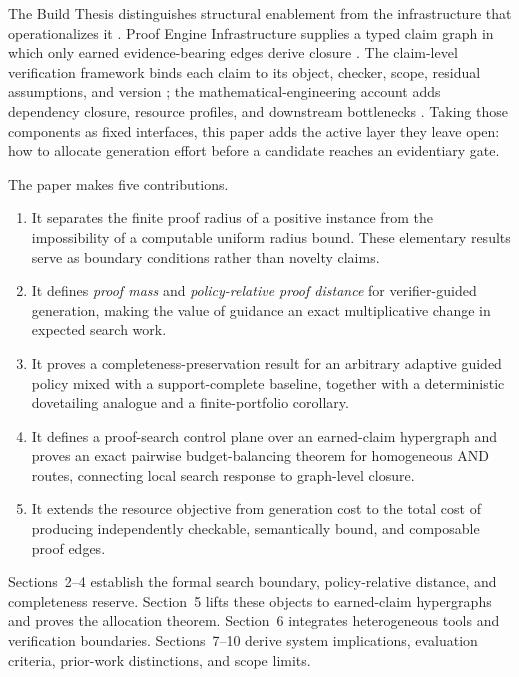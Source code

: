 \documentclass[11pt]{article}
\begin{document}
The Build Thesis distinguishes structural enablement from the infrastructure
that operationalizes it \citep{li2026build}.  Proof Engine Infrastructure
supplies a typed claim graph in which only earned evidence-bearing edges derive
closure \citep{li2026proofengine}.  The claim-level verification framework
binds each claim to its object, checker, scope, residual assumptions, and
version \citep{li2026auditable}; the mathematical-engineering account adds
dependency closure, resource profiles, and downstream bottlenecks
\citep{li2026engineering}.  Taking those components as fixed interfaces, this
paper adds the active layer they leave open: how to allocate generation effort
before a candidate reaches an evidentiary gate.

The paper makes five contributions.

\begin{enumerate}[leftmargin=*,itemsep=2pt]
  \item It separates the finite proof radius of a positive instance from the
        impossibility of a computable uniform radius bound.  These elementary
        results serve as boundary conditions rather than novelty claims.
  \item It defines \emph{proof mass} and \emph{policy-relative proof distance}
        for verifier-guided generation, making the value of guidance an exact
        multiplicative change in expected search work.
  \item It proves a completeness-preservation result for an arbitrary adaptive
        guided policy mixed with a support-complete baseline, together with a
        deterministic dovetailing analogue and a finite-portfolio corollary.
  \item It defines a proof-search control plane over an earned-claim hypergraph
        and proves an exact pairwise budget-balancing theorem for homogeneous
        AND routes, connecting local search response to graph-level closure.
  \item It extends the resource objective from generation cost to the total
        cost of producing independently checkable, semantically bound, and
        composable proof edges.
\end{enumerate}

Sections~2--4 establish the formal search boundary, policy-relative distance,
and completeness reserve.  Section~5 lifts these objects to earned-claim
hypergraphs and proves the allocation theorem.  Section~6 integrates
heterogeneous tools and verification boundaries.  Sections~7--10 derive system
implications, evaluation criteria, prior-work distinctions, and scope limits.
\end{document}
